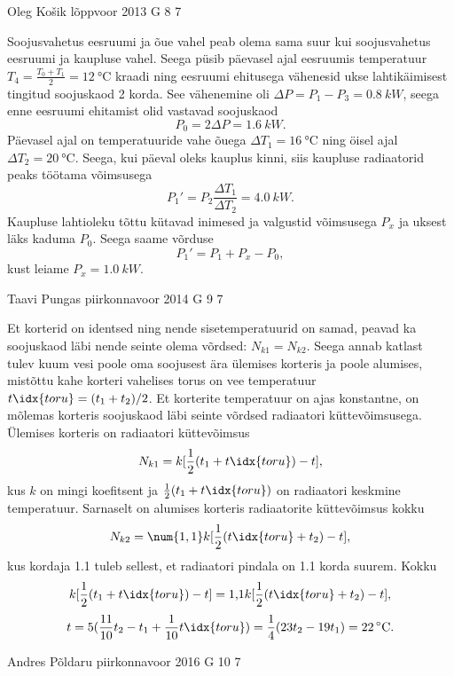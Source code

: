 \documentclass[11pt]{article}
\begin{document}
{%
{Oleg Košik} %
{lõppvoor} %
{2013} %
{G 8} %
{7} %
{

\ifSolution
Soojusvahetus eesruumi ja õue vahel peab olema sama suur kui soojusvahetus eesruumi ja kaupluse vahel. Seega püsib päevasel ajal eesruumis temperatuur $T_4=\frac{T_0+T_1}{2}=\SI{12}{\celsius}$ kraadi ning eesruumi ehitusega vähenesid ukse lahtikäimisest tingitud soojuskaod 2 korda. See vähenemine oli $\Delta P=P_1-P_3=\SI{0,8}{kW}$, seega enne eesruumi ehitamist olid vastavad soojuskaod
\[
P_0=2\Delta P=\SI{1,6}{kW}.
\]
Päevasel ajal on temperatuuride vahe õuega $\Delta T_1=\SI{16}{\celsius}$ ning öisel ajal $\Delta T_2=\SI{20}{\celsius}$. Seega, kui päeval oleks kauplus kinni, siis kaupluse radiaatorid peaks töötama võimsusega
\[
P_1'=P_2\frac{\Delta T_1}{\Delta T_2}=\SI{4,0}{kW}.
\]
Kaupluse lahtioleku tõttu kütavad inimesed ja valgustid võimsusega $P_x$ ja uksest läks kaduma $P_0$. Seega saame võrduse
\[
P_1'=P_1+P_x-P_0,
\]
kust leiame $P_x=\SI{1,0}{kW}$.
\fi
}

{Taavi Pungas} %
{piirkonnavoor} %
{2014} %
{G 9} %
{7} %
{

\ifSolution
Et korterid on identsed ning nende sisetemperatuurid on samad, peavad ka soojuskaod läbi nende seinte olema võrdsed: $N_{k1}=N_{k2}$. Seega annab katlast tulev kuum vesi poole oma soojusest ära ülemises korteris ja poole alumises, mistõttu kahe korteri vahelises torus on vee temperatuur $t\idx{toru}=(t_1+t_2)/2$. Et korterite temperatuur on ajas konstantne, on mõlemas korteris soojuskaod läbi seinte võrdsed radiaatori küttevõimsusega. Ülemises korteris on radiaatori küttevõimsus
\[
N_{k1}=k[\frac{1}{2}(t_1+t\idx{toru})-t],
\]
kus $k$ on mingi koefitsent ja $\frac{1}{2}(t_1+t\idx{toru})$ on radiaatori keskmine temperatuur. Sarnaselt on alumises korteris radiaatorite küttevõimsus kokku
\[
N_{k2}=\num{1,1} k[\frac{1}{2}(t\idx{toru}+t_{2})-t],
\]
kus kordaja \num{1,1} tuleb sellest, et radiaatori pindala on \num{1,1} korda suurem. Kokku
\[ k[\frac{1}{2}(t_1+t\idx{toru})-t]=\text{1,1}k[\frac{1}{2}(t\idx{toru}+t_{2})-t], \]
\[ t=5 (\frac{11}{10}t_2-t_1+\frac{1}{10}t\idx{toru})=\frac{1}{4}(23t_2-19t_1)=22\,^{\circ}\mathrm{C}. \]
\fi
}

{Andres Põldaru} %
{piirkonnavoor} %
{2016} %
{G 10} %
{7} %
{

}}
\end{document}
